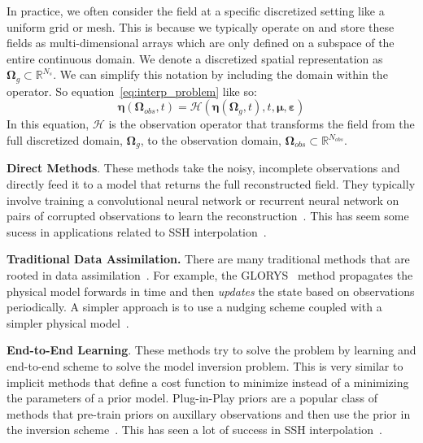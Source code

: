 In practice, we often consider the field at a specific discretized setting like a uniform grid or mesh. 
This is because we typically operate on and store these fields as multi-dimensional arrays which are only defined on a subspace of the entire continuous domain. 
We denote a discretized spatial representation as $\boldsymbol{\Omega}_g\subset\mathbb{R}^{N_s}$. 
We can simplify this notation by including the domain within the operator. So equation~\ref{eq:interp_problem} like so:
\begin{equation}\label{eq:interp_problem_discretized}
    \boldsymbol{\eta}(\boldsymbol{\Omega}_{obs},t ) = \mathcal{H}\left(\boldsymbol{\eta}(\boldsymbol{\Omega}_g,t), t, \boldsymbol{\mu},  \boldsymbol{\varepsilon} \right) 
\end{equation} 
%
In this equation, $\mathcal{H}$ is the observation operator that transforms the field from the full discretized domain, $\boldsymbol{\Omega}_g$, to the observation domain, $\boldsymbol{\Omega}_{obs}\subset\mathbb{R}^{N_{obs}}$.

\textbf{Direct Methods}. 
These methods take the noisy, incomplete observations and directly feed it to a model that returns the full reconstructed field.
They typically involve training a convolutional neural network or recurrent neural network on pairs of corrupted observations to learn the reconstruction~\cite{SuperResSurvey,IMAGE2IMAGETRANSLATION, IMAGE2IMAGETRANSLATION2}.
This has seem some sucess in applications related to SSH interpolation~\cite{SSHInterpUNet,SSHInterpConvLSTM, SSHInterpAttention}.

\textbf{Traditional Data Assimilation.}
There are many traditional methods that are rooted in data assimilation~\cite{DAGEOSCIENCE}.
For example, the GLORYS~\cite{GLORYS12} method propagates the physical model forwards in time and then \textit{updates} the state based on observations periodically.
A simpler approach is to use a nudging scheme coupled with a simpler physical model~\cite{BFNQG}.


\textbf{End-to-End Learning}. These methods try to solve the problem by learning and end-to-end scheme to solve the model inversion problem.
This is very similar to implicit methods that define a cost function to minimize instead of a minimizing the parameters of a prior model.
Plug-in-Play priors are a popular class of methods that pre-train priors on auxillary observations and then use the prior in the inversion scheme~\cite{DEEPUNFOLDING}.
This has seen a lot of success in SSH interpolation~\cite{4DVARNETSWOT,4DVARNETSST,4DVarNetSSC}.



